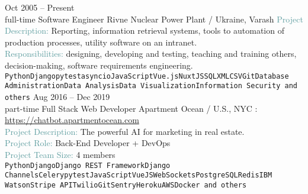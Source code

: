 \documentclass[9pt]{developercv} %
\begin{document}
\begin{entrylist}
	\entry
        {Oct 2005 -- Present\\\footnotesize{full-time}}
		{Software Engineer}
        {Rivne Nuclear Power Plant / Ukraine, Varash}
        {\textcolor{CadetBlue}{Project Description:} Reporting, information retrieval systems, tools to automation of production processes, utility software on an intranet.\\\textcolor{CadetBlue}{Responsibilities:} designing, developing and testing, teaching and training others, decision-making, software requirements engineering.\\
        \texttt{Python}\slashsep\texttt{Django}\slashsep\texttt{pytest}\slashsep\texttt{asyncio}\slashsep\texttt{JavaScript}\slashsep\texttt{Vue.js}\slashsep\texttt{NuxtJS}\slashsep\texttt{SQL}\slashsep\texttt{XML}\slashsep\texttt{CSV}\slashsep\texttt{Git}\slashsep\texttt{Database Administration}\slashsep\texttt{Data Analysis}\slashsep\texttt{Data Visualization}\slashsep\texttt{Information Security and others}}
	\entry
		{Aug 2016 -- Dec 2019\\\footnotesize{part-time}}
		{Full Stack Web Developer}
        {Apartment Ocean / U.S., NYC}
        {\faLink{}: {\href{https://chatbot.apartmentocean.com}{https://chatbot.apartmentocean.com}}\\\textcolor{CadetBlue}{Project Description:} The powerful AI for marketing in real estate.\\\textcolor{CadetBlue}{Project Role:} Back-End Developer + DevOps\\ \textcolor{CadetBlue}{Project Team Size:} 4 members\\ \texttt{Python}\slashsep\texttt{Django}\slashsep\texttt{Django REST Framework}\slashsep\texttt{Django
        Channels}\slashsep\texttt{Celery}\slashsep\texttt{pytest}\slashsep\texttt{JavaScript}\slashsep\texttt{VueJS}\slashsep\texttt{WebSockets}\slashsep\texttt{PostgreSQL}\slashsep\texttt{Redis}\slashsep\texttt{IBM Watson}\slashsep\texttt{Stripe
API}\slashsep\texttt{Twilio}\slashsep\texttt{Git}\slashsep\texttt{Sentry}\slashsep\texttt{Heroku}\slashsep\texttt{AWS}\slashsep\texttt{Docker and others}}
\end{entrylist}


\end{document}
